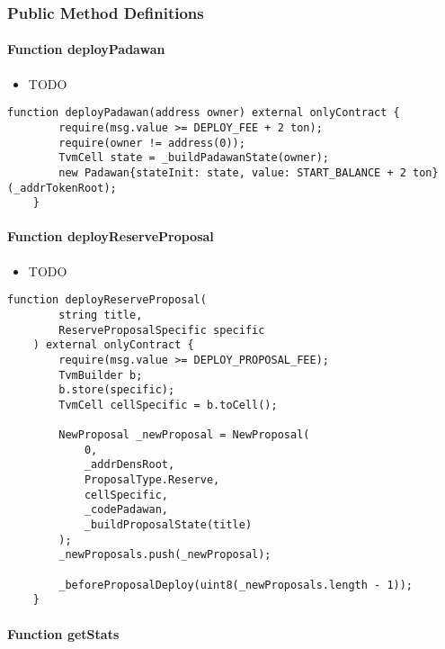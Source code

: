 \subsubsection{Public Method Definitions}


\paragraph{Function deployPadawan}

\begin{itemize}
\item TODO
\end{itemize}

\begin{lstlisting}[firstnumber=103]
    function deployPadawan(address owner) external onlyContract {
        require(msg.value >= DEPLOY_FEE + 2 ton);
        require(owner != address(0));
        TvmCell state = _buildPadawanState(owner);
        new Padawan{stateInit: state, value: START_BALANCE + 2 ton}(_addrTokenRoot);
    }
\end{lstlisting}

\paragraph{Function deployReserveProposal}

\begin{itemize}
\item TODO
\end{itemize}

\begin{lstlisting}[firstnumber=112]
    function deployReserveProposal(
        string title,
        ReserveProposalSpecific specific
    ) external onlyContract {
        require(msg.value >= DEPLOY_PROPOSAL_FEE);
        TvmBuilder b;
        b.store(specific);
        TvmCell cellSpecific = b.toCell();

        NewProposal _newProposal = NewProposal(
            0,
            _addrDensRoot,
            ProposalType.Reserve,
            cellSpecific,
            _codePadawan,
            _buildProposalState(title)
        );
        _newProposals.push(_newProposal);
        
        _beforeProposalDeploy(uint8(_newProposals.length - 1));
    }
\end{lstlisting}

\paragraph{Function getStats}

